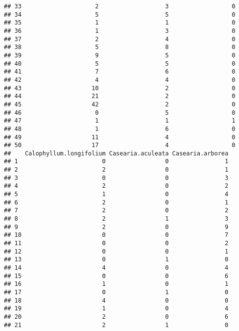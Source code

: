 \documentclass[
]{article}
\begin{document}
\begin{verbatim}
## 33                     2                   3                  0
## 34                     5                   5                  0
## 35                     1                   1                  0
## 36                     1                   3                  0
## 37                     2                   4                  0
## 38                     5                   8                  0
## 39                     9                   5                  0
## 40                     5                   5                  0
## 41                     7                   6                  0
## 42                     4                   4                  0
## 43                    10                   2                  0
## 44                    21                   2                  0
## 45                    42                   2                  0
## 46                     0                   5                  0
## 47                     1                   1                  1
## 48                     1                   6                  0
## 49                    11                   4                  0
## 50                    17                   4                  0
##    Calophyllum.longifolium Casearia.aculeata Casearia.arborea
## 1                        0                 0                1
## 2                        2                 0                1
## 3                        0                 0                3
## 4                        2                 0                2
## 5                        1                 0                4
## 6                        2                 0                1
## 7                        2                 0                2
## 8                        2                 1                3
## 9                        2                 0                9
## 10                       0                 0                7
## 11                       0                 0                2
## 12                       0                 0                1
## 13                       0                 1                0
## 14                       4                 0                4
## 15                       0                 0                6
## 16                       1                 0                1
## 17                       0                 1                0
## 18                       4                 0                0
## 19                       1                 0                4
## 20                       2                 0                6
## 21                       2                 1                0

\end{verbatim}
\end{document}
